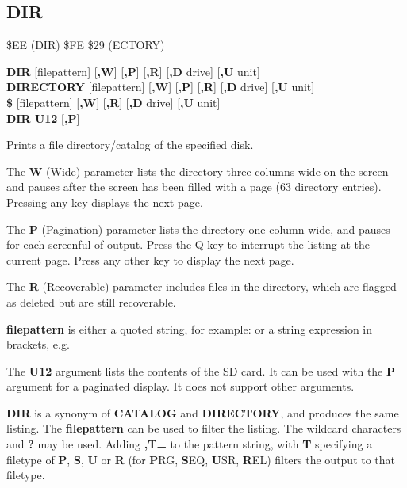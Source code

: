 
\newpage
\subsection{DIR}
\begin{description}[leftmargin=2cm,style=nextline]
\item [Token:] \$EE (DIR) \$FE \$29 (ECTORY)
\item [Format:] {\bf DIR} [filepattern] [{\bf,W}] [{\bf,P}] [{\bf,R}] [{\bf,D} drive] [{\bf,U} unit] \\
		{\bf DIRECTORY} [filepattern] [{\bf,W}] [{\bf,P}] [{\bf,R}] [{\bf,D} drive] [{\bf,U} unit] \\
		{\bf \$} [filepattern] [{\bf,W}] [{\bf,R}] [{\bf,D} drive] [{\bf,U} unit] \\
      {\bf DIR U12} [{\bf,P}]
\item [Usage:]  Prints a file directory/catalog of the specified disk.

   The {\bf W} (Wide) parameter lists the directory three columns wide
   on the screen and pauses after the screen has been filled with a page
   (63 directory entries). Pressing any key displays the next page.

   The {\bf P} (Pagination) parameter lists the directory one column wide,
   and pauses for each screenful of output. Press the Q key to
   interrupt the listing at the current page. Press any other key to display
   the next page.

   The {\bf R} (Recoverable) parameter includes files in the
   directory, which are flagged as deleted but are still
   recoverable.

   {\bf filepattern} is either a quoted string, for example:  or
   a string expression in brackets, e.g. 

   The {\bf U12} argument lists the contents of the SD card. It can be used with
   the {\bf P} argument for a paginated display. It does not support other arguments.

   \drivedefinition

   \unitdefinition

\item [Remarks:]
   {\bf DIR} is a synonym of {\bf CATALOG}
   and {\bf DIRECTORY}, and produces the same listing.
   The {\bf filepattern} can be used to filter the listing.
   The wildcard characters {\bf *} and {\bf ?} may be used.
   Adding {\bf ,T=} to the pattern string, with {\bf T} specifying
   a filetype of {\bf P}, {\bf S}, {\bf U} or {\bf R}
   (for {\bf P}RG, {\bf S}EQ, {\bf U}SR, {\bf R}EL) filters the
   output to that filetype.


\end{description}
